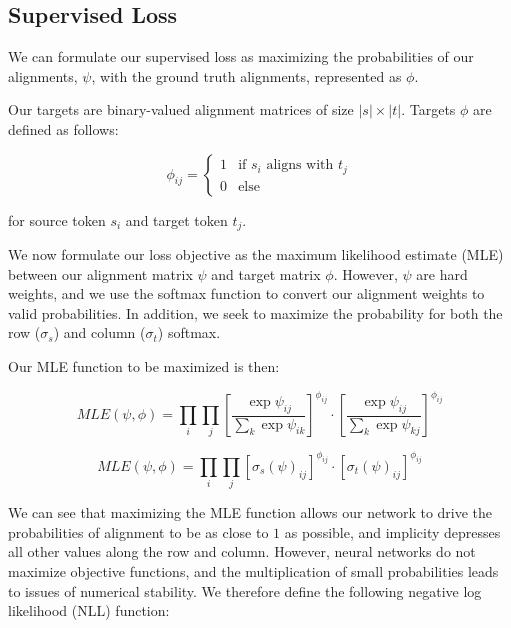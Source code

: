 \documentclass[twoside,twocolumn]{article}
\begin{document}
\subsection{Supervised Loss}
We can formulate our supervised loss as maximizing the probabilities of our
alignments, $\psi$, with the ground truth alignments, represented as $\phi$.

Our targets are binary-valued alignment matrices of size $|s| \times |t|$.
Targets $\phi$ are defined as follows:

\begin{equation}
  \phi_{ij} = \begin{cases}
  1 & \text{if } s_i \text{ aligns with } t_j \\
  0 & \text{else}
  \end{cases}
\end{equation}

\noindent for source token $s_i$ and target token $t_j$.

We now formulate our loss objective as the maximum likelihood estimate (MLE)
between our alignment matrix $\psi$ and target matrix $\phi$. However, $\psi$
are hard weights, and we use the softmax function to convert our alignment
weights to valid probabilities. In addition, we seek to maximize the
probability for both the row ($\sigma_s$) and column ($\sigma_t$) softmax.

Our MLE function to be maximized is then:

\begin{equation}
  MLE(\psi, \phi) = \prod_i \prod_j \left[ \frac{\exp \psi_{ij}}{\sum_k \exp \psi_{ik}} \right]^{\phi_{ij}} \cdot \left[ \frac{\exp \psi_{ij}}{\sum_k \exp \psi_{kj}} \right]^{\phi_{ij}}
\end{equation}

\begin{equation}
  MLE(\psi, \phi) = \prod_i \prod_j \left[ \sigma_s(\psi)_{ij} \right]^{\phi_{ij}} \cdot \left[ \sigma_t(\psi)_{ij} \right]^{\phi_{ij}}
\end{equation}

We can see that maximizing the MLE function allows our network to drive the
probabilities of alignment to be as close to $1$ as possible, and implicity
depresses all other values along the row and column. However, neural networks
do not maximize objective functions, and the multiplication of small
probabilities leads to issues of numerical stability. We therefore define the
following negative log likelihood (NLL) function:
\end{document}
